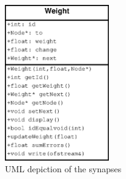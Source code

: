 \begin{figure}[h]
\centering
\includegraphics[width={0.4\textwidth}]{pictures/uml_weight}
\caption{UML depiction of the synapses}
\label{fig:uml_weight}
\end{figure}

